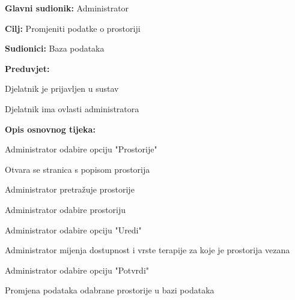 				\noindent {}
				\begin{packed_item}
					
					\item \textbf{Glavni sudionik: }Administrator
					\item  \textbf{Cilj: }Promjeniti podatke o prostoriji
					\item  \textbf{Sudionici: }Baza podataka
					\item  \textbf{Preduvjet: }
					\item[] \begin{packed_enum}
						
						\item[-] Djelatnik je prijavljen u sustav
						\item[-] Djelatnik ima ovlasti administratora
					\end{packed_enum}
					\item  \textbf{Opis osnovnog tijeka: }
					
					\item[] \begin{packed_enum}
						\item Administrator odabire opciju "Prostorije"
						\item Otvara se stranica s popisom prostorija
						\item Administrator pretražuje prostorije
						\item Administrator odabire prostoriju
						\item Administrator odabire opciju "Uredi"
						\item Administrator mijenja dostupnost i vrste terapije za koje je prostorija vezana
						\item Administrator odabire opciju "Potvrdi"
						\item Promjena podataka odabrane prostorije u bazi podataka
					\end{packed_enum}
					
				\end{packed_item}
				
